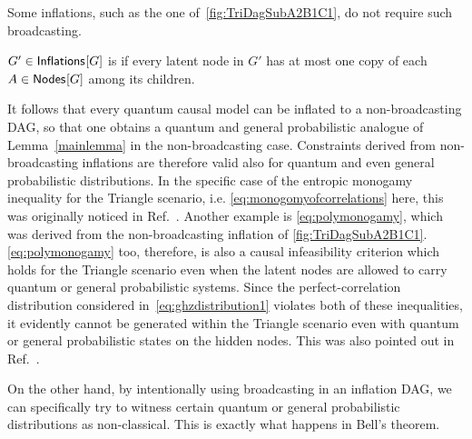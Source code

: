 Some inflations, such as the one of~\cref{fig:TriDagSubA2B1C1}, do not require such broadcasting.

\begin{definition}
	$G'\in{\operatorname{\mathsf{Inflations}}_{}}\lbrack G\rbrack$ is  if every latent node in $G'$ has at most one copy of each $A\in{\operatorname{\mathsf{Nodes}}_{}}\lbrack G\rbrack$ among its children.
\end{definition}

It follows that every quantum causal model can be inflated to a non-broadcasting DAG, so that one obtains a quantum and general probabilistic analogue of Lemma~\ref{mainlemma} in the non-broadcasting case. Constraints derived from non-broadcasting inflations are therefore valid also for quantum and even general probabilistic distributions. In the specific case of the entropic monogamy inequality for the Triangle scenario, i.e. \cref{eq:monogomyofcorrelations} here, this was originally noticed in Ref.~\cite{pusey2014gdag}. Another example is \cref{eq:polymonogamy}, which was derived from the non-broadcasting inflation of \cref{fig:TriDagSubA2B1C1}. \cref{eq:polymonogamy} too, therefore, is also a causal infeasibility criterion which holds for the Triangle scenario even when the latent nodes are allowed to carry quantum or general probabilistic systems.
Since the perfect-correlation distribution considered in~\cref{eq:ghzdistribution1} violates both of these inequalities, it evidently cannot be generated within the Triangle scenario even with quantum or general probabilistic states on the hidden nodes. This was also pointed out in Ref.~\cite{pusey2014gdag}.


On the other hand, by intentionally using broadcasting in an inflation DAG, we can specifically try to witness certain quantum or general probabilistic distributions as non-classical. This is exactly what happens in Bell's theorem.


